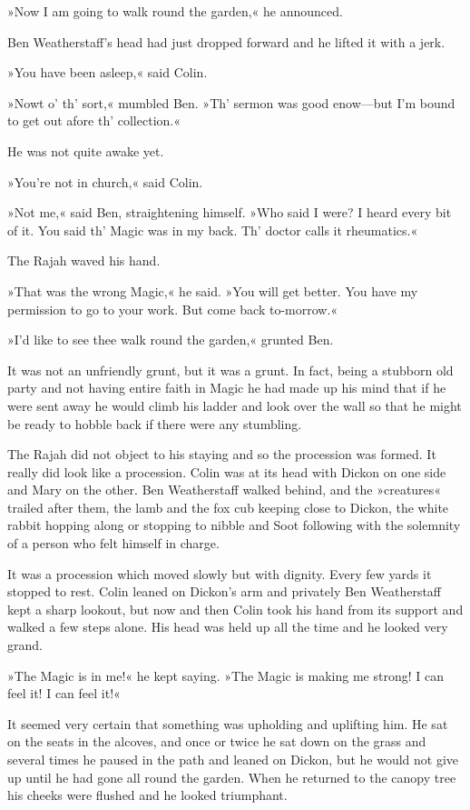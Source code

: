 »Now I am going to walk round the garden,« he announced.

Ben Weatherstaff's head had just dropped forward and he lifted it with a jerk.

»You have been asleep,« said Colin.

»Nowt o' th' sort,« mumbled Ben. »Th' sermon was good enow—but I'm bound to get out afore th' collection.«

He was not quite awake yet.

»You're not in church,« said Colin.

»Not me,« said Ben, straightening himself. »Who said I were? I heard every bit of it. You said th' Magic was in my back. Th' doctor calls it rheumatics.«

The Rajah waved his hand.

»That was the wrong Magic,« he said. »You will get better. You have my permission to go to your work. But come back to-morrow.«

»I'd like to see thee walk round the garden,« grunted Ben.

It was not an unfriendly grunt, but it was a grunt. In fact, being a stubborn old party and not having entire faith in Magic he had made up his mind that if he were sent away he would climb his ladder and look over the wall so that he might be ready to hobble back if there were any stumbling.

The Rajah did not object to his staying and so the procession was formed. It really did look like a procession. Colin was at its head with Dickon on one side and Mary on the other. Ben Weatherstaff walked behind, and the »creatures« trailed after them, the lamb and the fox cub keeping close to Dickon, the white rabbit hopping along or stopping to nibble and Soot following with the solemnity of a person who felt himself in charge.

It was a procession which moved slowly but with dignity. Every few yards it stopped to rest. Colin leaned on Dickon's arm and privately Ben Weatherstaff kept a sharp lookout, but now and then Colin took his hand from its support and walked a few steps alone. His head was held up all the time and he looked very grand.

»The Magic is in me!« he kept saying. »The Magic is making me strong! I can feel it! I can feel it!«

It seemed very certain that something was upholding and uplifting him. He sat on the seats in the alcoves, and once or twice he sat down on the grass and several times he paused in the path and leaned on Dickon, but he would not give up until he had gone all round the garden. When he returned to the canopy tree his cheeks were flushed and he looked triumphant.


